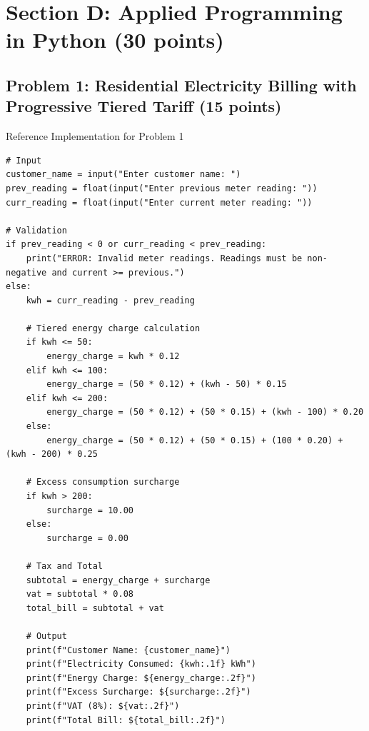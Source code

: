 \documentclass[11pt,a4paper]{article}
\begin{document}
\section*{Section D: Applied Programming in Python (30 points)}

\subsection*{Problem 1: Residential Electricity Billing with Progressive Tiered Tariff (15 points)}
\begin{solbox}{Reference Implementation for Problem 1}
\begin{lstlisting}
# Input
customer_name = input("Enter customer name: ")
prev_reading = float(input("Enter previous meter reading: "))
curr_reading = float(input("Enter current meter reading: "))

# Validation
if prev_reading < 0 or curr_reading < prev_reading:
    print("ERROR: Invalid meter readings. Readings must be non-negative and current >= previous.")
else:
    kwh = curr_reading - prev_reading

    # Tiered energy charge calculation
    if kwh <= 50:
        energy_charge = kwh * 0.12
    elif kwh <= 100:
        energy_charge = (50 * 0.12) + (kwh - 50) * 0.15
    elif kwh <= 200:
        energy_charge = (50 * 0.12) + (50 * 0.15) + (kwh - 100) * 0.20
    else:
        energy_charge = (50 * 0.12) + (50 * 0.15) + (100 * 0.20) + (kwh - 200) * 0.25

    # Excess consumption surcharge
    if kwh > 200:
        surcharge = 10.00
    else:
        surcharge = 0.00

    # Tax and Total
    subtotal = energy_charge + surcharge
    vat = subtotal * 0.08
    total_bill = subtotal + vat

    # Output
    print(f"Customer Name: {customer_name}")
    print(f"Electricity Consumed: {kwh:.1f} kWh")
    print(f"Energy Charge: ${energy_charge:.2f}")
    print(f"Excess Surcharge: ${surcharge:.2f}")
    print(f"VAT (8%): ${vat:.2f}")
    print(f"Total Bill: ${total_bill:.2f}")
\end{lstlisting}
\end{solbox}
\end{document}
